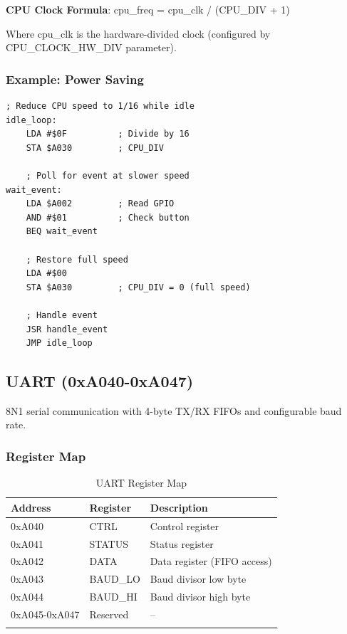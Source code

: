 \documentclass[11pt,a4paper]{article}
\begin{document}
\textbf{CPU Clock Formula}: cpu\_freq = cpu\_clk / (CPU\_DIV + 1)

Where cpu\_clk is the hardware-divided clock (configured by CPU\_CLOCK\_HW\_DIV parameter).

\subsubsection{Example: Power Saving}

\begin{lstlisting}[language=asm6502, caption=Slow down CPU while waiting]
; Reduce CPU speed to 1/16 while idle
idle_loop:
    LDA #$0F          ; Divide by 16
    STA $A030         ; CPU_DIV

    ; Poll for event at slower speed
wait_event:
    LDA $A002         ; Read GPIO
    AND #$01          ; Check button
    BEQ wait_event

    ; Restore full speed
    LDA #$00
    STA $A030         ; CPU_DIV = 0 (full speed)

    ; Handle event
    JSR handle_event
    JMP idle_loop
\end{lstlisting}

\subsection{UART (0xA040-0xA047)}

8N1 serial communication with 4-byte TX/RX FIFOs and configurable baud rate.

\subsubsection{Register Map}

\begin{longtable}{lll}
\toprule
\textbf{Address} & \textbf{Register} & \textbf{Description} \\
\midrule
\endhead
0xA040 & CTRL & Control register \\
0xA041 & STATUS & Status register \\
0xA042 & DATA & Data register (FIFO access) \\
0xA043 & BAUD\_LO & Baud divisor low byte \\
0xA044 & BAUD\_HI & Baud divisor high byte \\
0xA045-0xA047 & Reserved & -- \\
\bottomrule
\caption{UART Register Map}
\end{longtable}
\end{document}
